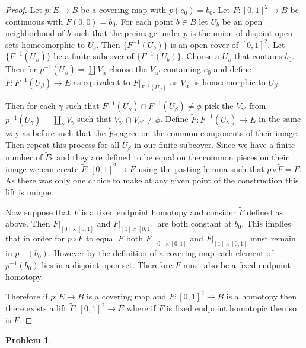 \documentclass[10pt]{article}
\newcommand{\sk}{\vskip 10mm}
\theoremstyle{plain}
\newtheorem{problem}{Problem}
\theoremstyle{remark}
\begin{document}
\begin{proof}
  Let $p:E\rightarrow B$ be a covering map with $p(e_0)=b_0$. Let $F:[0,1]^2\rightarrow B$ be continuous
  with $F(0,0)=b_0$. For each point $b\in B$ let $U_b$ be an open neighborhood of $b$ such
  that the preimage under $p$ is the union of disjoint open sets homeomorphic to $U_b$. 
  Then $\{F^{-1}(U_b)\}$ is an open cover of $[0,1]^2$. Let $\{F^{-1}(U_\beta)\}$ be a finite subcover
  of $\{F^{-1}(U_b)\}$. Choose a $U_\beta$ that contains $b_0$. Then for
  $p^{-1}(U_\beta)=\coprod V_\alpha$ choose the $V_{\alpha'}$ containing $e_0$ and define
  $\tilde{F}:F^{-1}(U_\beta)\rightarrow E$ as equivalent to $F|_{F^{-1}(U_\beta)}$ as $V_{\alpha'}$ is homeomorphic
  to $U_\beta$.

  Then for each $\gamma$ such that $F^{-1}(U_\gamma)\cap F^{-1}(U_\beta)\neq \phi$  pick the $V_{\gamma'}$ from
  $p^{-1}(U_\gamma)=\coprod_\gamma V_\gamma$ such that $V_{\gamma'}\cap V_{\alpha'}\neq \phi$. Define $\tilde{F}:F^{-1}(U_\gamma)\rightarrow E$ in
  the same way as before such that the $\tilde{F}$s agree on the common components of their
  image. Then repeat this process for all $U_\beta$ in our finite subcover.
  Since we have a finite number of $\tilde{F}$s and they are defined to be equal on
  the common pieces on their image we can create $\tilde{F}:[0,1]^2\rightarrow E$ using the pasting
  lemma such that $p\circ \tilde{F}=F$. As there was only one choice to make at any given
  point of the construction this lift is unique.

  Now suppose that $F$ is a fixed endpoint homotopy and consider $\tilde{F}$ defined
  as above. Then $F|_{[0]\times[0,1]}$ and $F|_{[1]\times[0,1]}$ are both constant at $b_0$.
  This implies that in order for $p\circ \tilde{F}$ to equal $F$ both
  $\tilde{F}|_{[0]\times[0,1]}$ and $\tilde{F}|_{[1]\times[0,1]}$ must remain in $p^{-1}(b_0)$.
  However by the definition of a covering map each element of $p^{-1}(b_0)$ lies in
  a disjoint open set. Therefore $\tilde{F}$ must also be a fixed endpoint homotopy.
  
  
  Therefore if $p:E\rightarrow B$ is a covering map and $F:[0,1]^2\rightarrow B$ is a homotopy then
  there exists a lift $\tilde{F}:[0,1]^2\rightarrow E$ where if $F$ is fixed endpoint homotopic
  then so is $\tilde{F}$.
\end{proof}

\sk

\begin{problem} %
  
\end{problem}
\end{document}
